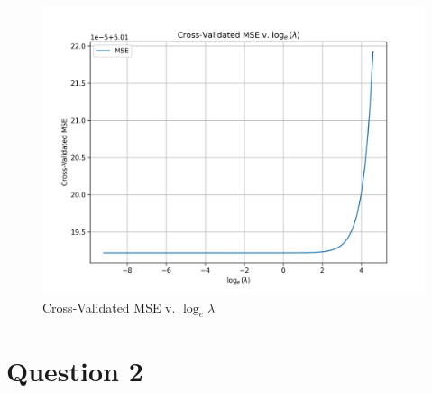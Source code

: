 \documentclass[11pt]{article}
\begin{document}
\begin{figure}[h!]
  \includegraphics[width=\textwidth]{../plots/crossvalmse_vs_loglambda.png}
  \centering
  \caption{Cross-Validated MSE v. $\log_e{\lambda}$}
\end{figure}


\clearpage

\section*{Question 2}
\end{document}
